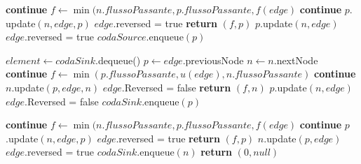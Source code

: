 \documentclass{article}
\begin{document}
\begin{algorithm}
    \begin{algorithmic}[1]
        \STATE \textbf{continue}
        \ELSE
        \STATE $f \leftarrow \min(n.flussoPassante,p.flussoPassante,f(edge)$
        \STATE \textbf{continue}
        \ENDIF
        \STATE $p.$update$(n,edge,p)$
        \STATE $edge.$reversed = true
        \STATE \textbf{return} $(f,p)$
        \ENDIF
        \ENDIF
        \STATE $p.$update$(n,edge)$
        \STATE $edge.$reversed = true
        \STATE $codaSource.$enqueue$(p)$
        \ENDIF

        \ENDFOR
        \ENDIF

        \STATE $element \leftarrow codaSink.$dequeue()
        \STATE $p \leftarrow edge$.previousNode
        \STATE $n \leftarrow n.$nextNode
        \STATE \textbf{continue}
        \ELSE
        \STATE $f \leftarrow \min(p.flussoPassante,u(edge),n.flussoPassante)$
        \STATE \textbf{continue}
        \ENDIF
        \STATE $n.$update$(p,edge,n)$
        \STATE $edge.$Reversed = false
        \STATE \textbf{return} $(f,n)$
        \ENDIF
        \ENDIF
        \STATE $p.$update$(n,edge)$
        \STATE $edge.$Reversed = false
        \STATE $codaSink.$enqueue$(p)$
        \ENDIF
    \end{algorithmic}
\end{algorithm}
\newpage
\begin{algorithm}
    \begin{algorithmic}[1]
        \STATE \textbf{continue}
        \ELSE
        \STATE $f \leftarrow \min(n.flussoPassante,p.flussoPassante,f(edge)$
        \STATE \textbf{continue}
        \ENDIF
        \STATE $p$.update$(n,edge,p)$
        \STATE $edge$.reversed = true
        \STATE \textbf{return} $(f,p)$
        \ENDIF
        \ENDIF
        \STATE $n.$update$(p,edge)$
        \STATE $edge$.reversed = true
        \STATE $codaSink.$enqueue$(n)$
        \ENDIF
        \ENDFOR
        \ENDIF
        \ENDWHILE
        \STATE \textbf{return} $(0,null)$
    \end{algorithmic}
\end{algorithm}
\end{document}
